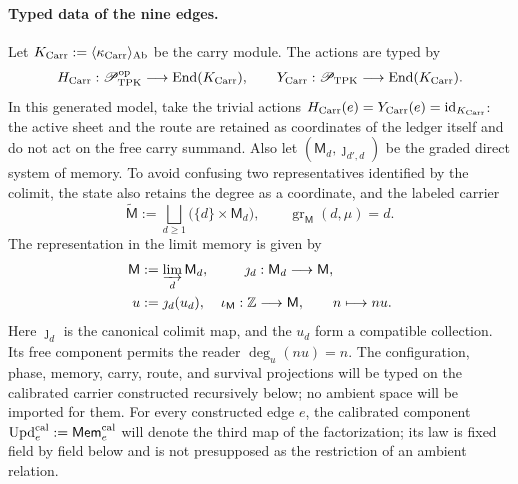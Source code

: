 \paragraph{Typed data of the nine edges.}
Let \(K_{\rm Carr}:=\langle\kappa_{\rm Carr}\rangle_{\rm Ab}\) be the carry
module. The actions are typed by
\[
 H_{\rm Carr}:\mathscr P_{\rm TPK}^{\rm op}
   \longrightarrow\operatorname{End}(K_{\rm Carr}),\qquad
 Y_{\rm Carr}:\mathscr P_{\rm TPK}
   \longrightarrow\operatorname{End}(K_{\rm Carr}).
\]
In this generated model, take the trivial actions
\(H_{\rm Carr}(e)=Y_{\rm Carr}(e)=\operatorname{id}_{K_{\rm Carr}}\): the
active sheet and the route are retained as coordinates of the ledger itself
and do not act on the free carry summand. Also let
\((\mathsf M_d,\jmath_{d',d})\) be the graded direct system of memory. To
avoid confusing two representatives identified by the colimit, the state also
retains the degree as a coordinate, and the labeled carrier
\[
 \widetilde{\mathsf M}:=
 \bigsqcup_{d\ge1}\bigl(\{d\}\times\mathsf M_d\bigr),
 \qquad
 \operatorname{gr}_{\mathsf M}(d,\mu)=d.
\]
The representation in the limit memory is given by
\[
\begin{aligned}
 \mathsf M&:=\varinjlim_d\mathsf M_d,&
 \jmath_d&:\mathsf M_d\longrightarrow\mathsf M,\\
 u&:=\jmath_d(u_d),&
 \iota_{\mathsf M}:\mathbb Z&\longrightarrow\mathsf M,
 \qquad n\longmapsto nu .
\end{aligned}
\]
Here \(\jmath_d\) is the canonical colimit map, and the \(u_d\) form a
compatible collection. Its free component permits the reader \(\deg_u(nu)=n\).
The configuration, phase, memory, carry, route, and survival projections will
be typed on the calibrated carrier constructed recursively below; no ambient
space will be imported for them. For every constructed edge \(e\), the
calibrated component
\(\operatorname{Upd}^{\rm cal}_e:=\mathsf{Mem}^{\rm cal}_e\) will denote the
third map of the factorization; its law is fixed field by field below and is
not presupposed as the restriction of an ambient relation.

